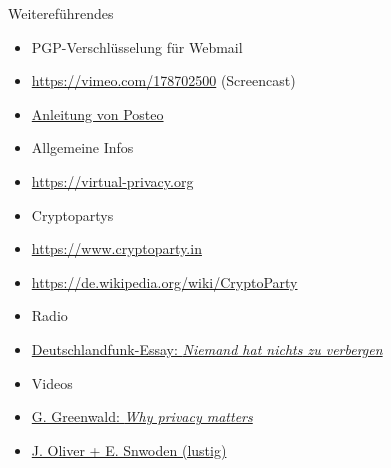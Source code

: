\documentclass{beamer}
\begin{document}
\begin{frame}{Weitereführendes}

\begin{itemize}
\item[] \hspace{-2em} PGP-Verschlüsselung für Webmail
  \item \url{https://vimeo.com/178702500} (Screencast)\\[2mm]
  \item \href{https://posteo.de/hilfe/wie-installiere-ich-eine-ende-zu-ende-verschluesselung-pgp-im-browser}{Anleitung von Posteo}
  \item[] \hspace{-2em} Allgemeine Infos
  \item \url{https://virtual-privacy.org}
  \item[] \hspace{-2em} Cryptopartys
  \item \url{https://www.cryptoparty.in}
  \item \url{https://de.wikipedia.org/wiki/CryptoParty}
  \item[] \hspace{-2em} Radio
  \item \href{http://www.deutschlandfunk.de/ein-essay-ueber-geheimnisse-niemand-hat-nichts-zu-verbergen.1184.de.html?dram:article_id=395252}{Deutschlandfunk-Essay: \textit{Niemand hat nichts zu verbergen}}
  \item[] \hspace{-2em} Videos
  \item \href{https://www.ted.com/talks/glenn_greenwald_why_privacy_matters}{G. Greenwald: \textit{Why privacy matters}}
  \item \href{https://www.youtube.com/watch?v=XEVlyP4_11M}{J. Oliver + E. Snwoden (lustig)}
\end{itemize}
\end{frame}


\end{document}
